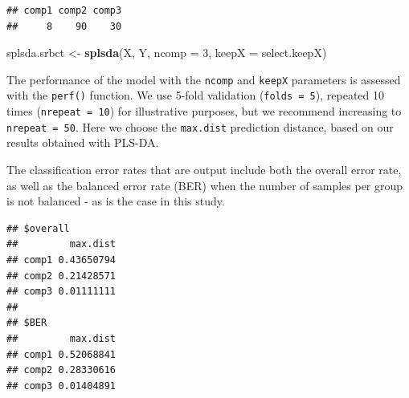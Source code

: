 \documentclass[]{book}
\newenvironment{Shaded}{\begin{snugshade}}{\end{snugshade}}
\newcommand{\CommentTok}[1]{\textcolor[rgb]{0.56,0.35,0.01}{\textit{#1}}}
\newcommand{\DataTypeTok}[1]{\textcolor[rgb]{0.13,0.29,0.53}{#1}}
\newcommand{\DecValTok}[1]{\textcolor[rgb]{0.00,0.00,0.81}{#1}}
\newcommand{\KeywordTok}[1]{\textcolor[rgb]{0.13,0.29,0.53}{\textbf{#1}}}
\newcommand{\NormalTok}[1]{#1}
\newcommand{\OperatorTok}[1]{\textcolor[rgb]{0.81,0.36,0.00}{\textbf{#1}}}
\newcommand{\OtherTok}[1]{\textcolor[rgb]{0.56,0.35,0.01}{#1}}
\newcommand{\StringTok}[1]{\textcolor[rgb]{0.31,0.60,0.02}{#1}}
\begin{document}
\begin{verbatim}
## comp1 comp2 comp3 
##     8    90    30
\end{verbatim}

\begin{Shaded}
\begin{Highlighting}[]
\NormalTok{splsda.srbct <-}\StringTok{ }\KeywordTok{splsda}\NormalTok{(X, Y, }\DataTypeTok{ncomp =} \DecValTok{3}\NormalTok{, }\DataTypeTok{keepX =}\NormalTok{ select.keepX) }
\end{Highlighting}
\end{Shaded}

The performance of the model with the \texttt{ncomp} and \texttt{keepX} parameters is assessed with the \texttt{perf()} function. We use 5-fold validation (\texttt{folds\ =\ 5}), repeated 10 times (\texttt{nrepeat\ =\ 10}) for illustrative purposes, but we recommend increasing to \texttt{nrepeat\ =\ 50}. Here we choose the \texttt{max.dist} prediction distance, based on our results obtained with PLS-DA.

The classification error rates that are output include both the overall error rate, as well as the balanced error rate (BER) when the number of samples per group is not balanced - as is the case in this study.

\begin{Shaded}
\end{Shaded}

\begin{verbatim}
## $overall
##         max.dist
## comp1 0.43650794
## comp2 0.21428571
## comp3 0.01111111
## 
## $BER
##         max.dist
## comp1 0.52068841
## comp2 0.28330616
## comp3 0.01404891
\end{verbatim}
\end{document}
